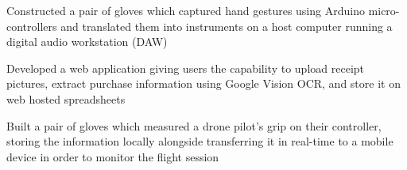 \documentclass[]{resume-openfont}
\begin{document}
\begin{minipage}[t]{1\textwidth}
Constructed a pair of gloves which captured hand gestures using Arduino micro-controllers and translated them into instruments on a host computer running a digital audio workstation (DAW)
\sectionsep

Developed a web application giving users the capability to upload receipt pictures, extract purchase information using Google Vision OCR, and store it on web hosted spreadsheets
\sectionsep


Built a pair of gloves which measured a drone pilot's grip on their controller, storing the information locally alongside transferring it in real-time to a mobile device in order to monitor the flight session
\sectionsep


\vspace{-50 mm}
\end{minipage} 
\end{document}
